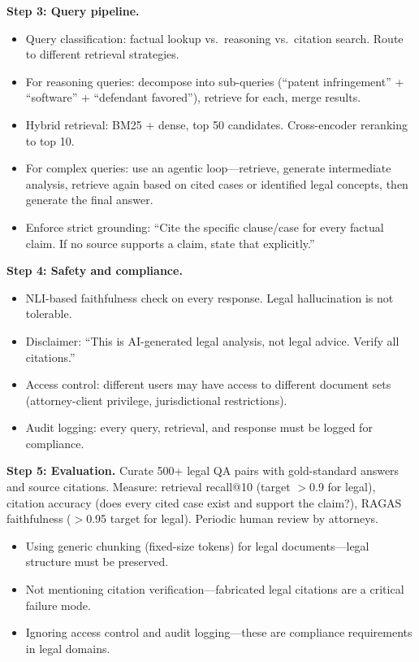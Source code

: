 \begin{interviewq}
\textbf{Step 3: Query pipeline.}
\begin{itemize}
    \item Query classification: factual lookup vs.\ reasoning vs.\ citation search. Route to different retrieval strategies.
    \item For reasoning queries: decompose into sub-queries (``patent infringement'' + ``software'' + ``defendant favored''), retrieve for each, merge results.
    \item Hybrid retrieval: BM25 + dense, top 50 candidates. Cross-encoder reranking to top 10.
    \item For complex queries: use an agentic loop---retrieve, generate intermediate analysis, retrieve again based on cited cases or identified legal concepts, then generate the final answer.
    \item Enforce strict grounding: ``Cite the specific clause/case for every factual claim. If no source supports a claim, state that explicitly.''
\end{itemize}

\textbf{Step 4: Safety and compliance.}
\begin{itemize}
    \item NLI-based faithfulness check on every response. Legal hallucination is not tolerable.
    \item Disclaimer: ``This is AI-generated legal analysis, not legal advice. Verify all citations.''
    \item Access control: different users may have access to different document sets (attorney-client privilege, jurisdictional restrictions).
    \item Audit logging: every query, retrieval, and response must be logged for compliance.
\end{itemize}

\textbf{Step 5: Evaluation.} Curate 500+ legal QA pairs with gold-standard answers and source citations. Measure: retrieval recall@10 (target $>$0.9 for legal), citation accuracy (does every cited case exist and support the claim?), RAGAS faithfulness ($>$0.95 target for legal). Periodic human review by attorneys.

\redflags
\begin{itemize}
    \item Using generic chunking (fixed-size tokens) for legal documents---legal structure must be preserved.
    \item Not mentioning citation verification---fabricated legal citations are a critical failure mode.
    \item Ignoring access control and audit logging---these are compliance requirements in legal domains.
\end{itemize}


\end{interviewq}
